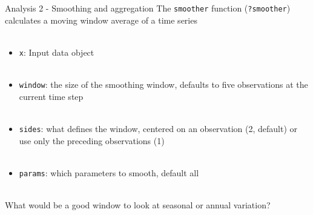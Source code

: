 \documentclass[xcolor=dvipsnames,serif]{beamer}\usepackage[]{graphicx}\usepackage[]{color}
\begin{document}
\begin{frame}[containsverbatim]{Analysis 2 - Smoothing and aggregation}
The \texttt{smoother} function (\texttt{?smoother}) calculates a moving window average of a time series \\~\\
\begin{itemize}
\item \texttt{x}: Input data object \\~\\
\item \texttt{window}: the size of the smoothing window, defaults to five observations at the current time step \\~\\
\item \texttt{sides}: what defines the window, centered on an observation (2, default) or use only the preceding observations (1)  \\~\\
\item \texttt{params}: which parameters to smooth, default all \\~\\
\end{itemize}
What would be a good window to look at seasonal or annual variation?
\end{frame}
\end{document}
